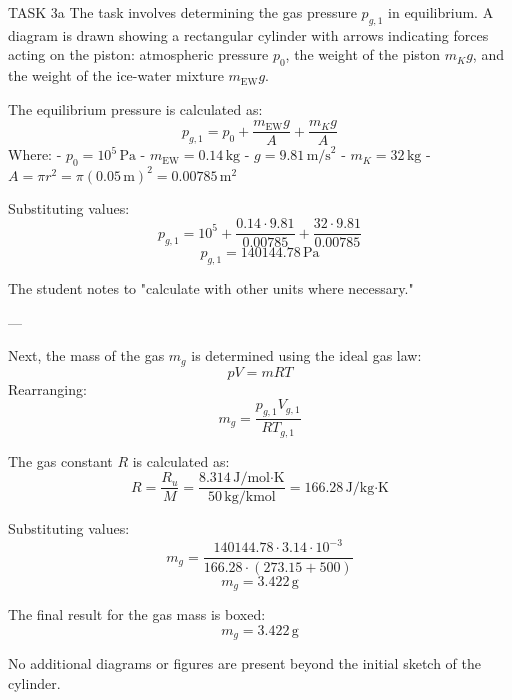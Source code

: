 TASK 3a  
The task involves determining the gas pressure \( p_{g,1} \) in equilibrium. A diagram is drawn showing a rectangular cylinder with arrows indicating forces acting on the piston: atmospheric pressure \( p_0 \), the weight of the piston \( m_K g \), and the weight of the ice-water mixture \( m_{\text{EW}} g \).  

The equilibrium pressure is calculated as:  
\[
p_{g,1} = p_0 + \frac{m_{\text{EW}} g}{A} + \frac{m_K g}{A}
\]  
Where:  
- \( p_0 = 10^5 \, \text{Pa} \)  
- \( m_{\text{EW}} = 0.14 \, \text{kg} \)  
- \( g = 9.81 \, \text{m/s}^2 \)  
- \( m_K = 32 \, \text{kg} \)  
- \( A = \pi r^2 = \pi (0.05 \, \text{m})^2 = 0.00785 \, \text{m}^2 \)  

Substituting values:  
\[
p_{g,1} = 10^5 + \frac{0.14 \cdot 9.81}{0.00785} + \frac{32 \cdot 9.81}{0.00785}
\]  
\[
p_{g,1} = 140144.78 \, \text{Pa}
\]  

The student notes to "calculate with other units where necessary."  

---

Next, the mass of the gas \( m_g \) is determined using the ideal gas law:  
\[
p V = m R T
\]  
Rearranging:  
\[
m_g = \frac{p_{g,1} V_{g,1}}{R T_{g,1}}
\]  

The gas constant \( R \) is calculated as:  
\[
R = \frac{R_u}{M} = \frac{8.314 \, \text{J/mol·K}}{50 \, \text{kg/kmol}} = 166.28 \, \text{J/kg·K}
\]  

Substituting values:  
\[
m_g = \frac{140144.78 \cdot 3.14 \cdot 10^{-3}}{166.28 \cdot (273.15 + 500)}
\]  
\[
m_g = 3.422 \, \text{g}
\]  

The final result for the gas mass is boxed:  
\[
m_g = 3.422 \, \text{g}
\]  

No additional diagrams or figures are present beyond the initial sketch of the cylinder.